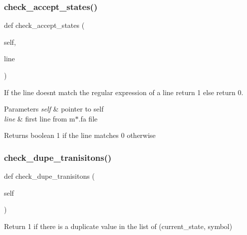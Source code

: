 \subsubsection{\texorpdfstring{check\+\_\+accept\+\_\+states()}{check\_accept\_states()}}
{\footnotesize\ttfamily def check\+\_\+accept\+\_\+states (\begin{DoxyParamCaption}\item[{}]{self,  }\item[{}]{line }\end{DoxyParamCaption})}



If the line doesn\textquotesingle{}t match the regular expression of a line return 1 else return 0. 


\begin{DoxyParams}{Parameters}
{\em self} & pointer to self \\
\hline
{\em line} & first line from m$\ast$.fa file \\
\hline
\end{DoxyParams}
\begin{DoxyReturn}{Returns}
boolean 1 if the line matches 0 otherwise 
\end{DoxyReturn}
\mbox{\label{classfinite__automaton_1_1_f_a_ac6ce3b4cc7d71b74ce160e55062a0402}} 
\subsubsection{\texorpdfstring{check\+\_\+dupe\+\_\+tranisitons()}{check\_dupe\_tranisitons()}}
{\footnotesize\ttfamily def check\+\_\+dupe\+\_\+tranisitons (\begin{DoxyParamCaption}\item[{}]{self }\end{DoxyParamCaption})}



Return 1 if there is a duplicate value in the list of (current\+\_\+state, symbol) 


